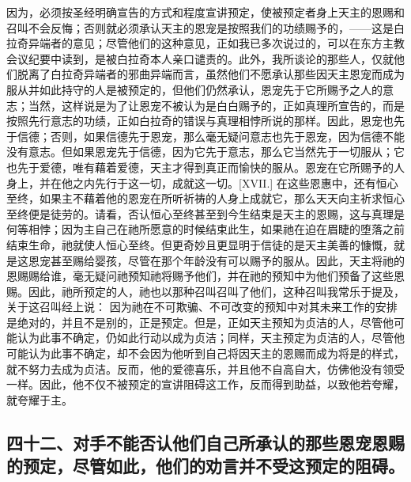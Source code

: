因为，必须按圣经明确宣告的方式和程度宣讲预定，使被预定者身上天主的恩赐和召叫不会反悔；否则就必须承认天主的恩宠是按照我们的功绩赐予的，——这是白拉奇异端者的意见；尽管他们的这种意见，正如我已多次说过的，可以在东方主教会议纪要中读到，是被白拉奇本人亲口谴责的。此外，我所谈论的那些人，仅就他们脱离了白拉奇异端者的邪曲异端而言，虽然他们不愿承认那些因天主恩宠而成为服从并如此持守的人是被预定的，但他们仍然承认，恩宠先于它所赐予之人的意志；当然，这样说是为了让恩宠不被认为是白白赐予的，正如真理所宣告的，而是按照先行意志的功绩，正如白拉奇的错误与真理相悖所说的那样。因此，恩宠也先于信德；否则，如果信德先于恩宠，那么毫无疑问意志也先于恩宠，因为信德不能没有意志。但如果恩宠先于信德，因为它先于意志，那么它当然先于一切服从；它也先于爱德，唯有藉着爱德，天主才得到真正而愉快的服从。恩宠在它所赐予的人身上，并在他之内先行于这一切，成就这一切。[XVII.] 在这些恩惠中，还有恒心至终，如果主不藉着他的恩宠在所听祈祷的人身上成就它，那么天天向主祈求恒心至终便是徒劳的。请看，否认恒心至终甚至到今生结束是天主的恩赐，这与真理是何等相悖；因为主自己在祂所愿意的时候结束此生，如果祂在迫在眉睫的堕落之前结束生命，祂就使人恒心至终。但更奇妙且更显明于信徒的是天主美善的慷慨，就是这恩宠甚至赐给婴孩，尽管在那个年龄没有可以赐予的服从。因此，天主将祂的恩赐赐给谁，毫无疑问祂预知祂将赐予他们，并在祂的预知中为他们预备了这些恩赐。因此，祂所预定的人，祂也以那种召叫召叫了他们，这种召叫我常乐于提及，关于这召叫经上说： 因为祂在不可欺骗、不可改变的预知中对其未来工作的安排是绝对的，并且不是别的，正是预定。但是，正如天主预知为贞洁的人，尽管他可能认为此事不确定，仍如此行动以成为贞洁；同样，天主预定为贞洁的人，尽管他可能认为此事不确定，却不会因为他听到自己将因天主的恩赐而成为将是的样式，就不努力去成为贞洁。反而，他的爱德喜乐，并且他不自高自大，仿佛他没有领受一样。因此，他不仅不被预定的宣讲阻碍这工作，反而得到助益，以致他若夸耀，就夸耀于主。\par


\subsection{四十二、对手不能否认他们自己所承认的那些恩宠恩赐的预定，尽管如此，他们的劝言并不受这预定的阻碍。}

